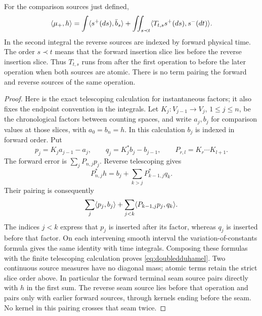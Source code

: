 \begin{lemma}\label{lem:duhamel}
For the comparison sources just defined,
\begin{equation}\label{eq:doubledduhamel}
 \langle \mu_+,h\rangle
 =\int\langle s^+(ds),\bar b_s\rangle
  +\iint_{s\prec t}
          \langle T_{t,s}s^+(ds),s^-(dt)\rangle.
\end{equation}
In the second integral the reverse sources are indexed by forward
physical time.  The order $s\prec t$ means that the forward insertion
slice lies before the reverse insertion slice.  Thus $T_{t,s}$ runs
from after the first operation to before the later operation when
both sources are atomic.  There is no term pairing the forward and
reverse sources of the same operation.
\end{lemma}

\begin{proof}
Here is the exact telescoping calculation for instantaneous factors;
it also fixes the endpoint convention in the integrals.  Let
$K_j:V_{j-1}\to V_j$, $1\le j\le n$, be the chronological factors
between counting spaces, and write $a_j,b_j$ for comparison values
at those slices, with $a_0=b_n=h$.  In this calculation $b_j$
is indexed in forward order.  Put
\[
 p_j=K_j a_{j-1}-a_j,\qquad
 q_j=K_j^*b_j-b_{j-1},\qquad
 P_{r,l}=K_r\cdots K_{l+1}.
\]
The forward error is $\sum_jP_{n,j}p_j$.  Reverse telescoping gives
\[
 P_{n,j}^*h=b_j+\sum_{k>j}P_{k-1,j}^*q_k.
\]
Their pairing is consequently
\[
 \sum_j\langle p_j,b_j\rangle
       +\sum_{j<k}\langle P_{k-1,j}p_j,q_k\rangle.
\]
The indices $j<k$ express that $p_j$ is inserted after its factor,
whereas $q_j$ is inserted before that factor.  On each intervening
smooth interval the variation-of-constants formula gives the same
identity with time integrals.  Composing these formulas with the
finite telescoping calculation proves \eqref{eq:doubledduhamel}.
Two continuous source measures have no diagonal mass; atomic terms
retain the strict slice order above.  In particular the forward
terminal seam source pairs directly with $h$ in the first sum.
The reverse seam source lies before that operation and pairs only
with earlier forward sources, through kernels ending before the
seam.  No kernel in this pairing crosses that seam twice.
\end{proof}
